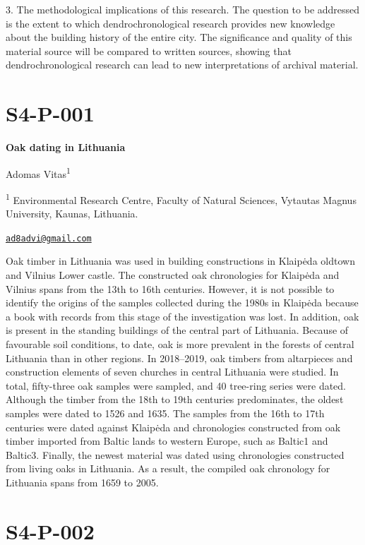 \documentclass[
]{book}
\begin{document}
3. The methodological implications of this research. The question to be addressed is the extent to which dendrochronological research provides new knowledge about the building history of the entire city. The significance and quality of this material source will be compared to written sources, showing that dendrochronological research can lead to new interpretations of archival material.

\hypertarget{s4-p-001}{%
\section*{S4-P-001}\label{s4-p-001}}

\textbf{Oak dating in Lithuania}

Adomas Vitas\textsuperscript{1}

\textsuperscript{1} Environmental Research Centre, Faculty of Natural Sciences, Vytautas Magnus University, Kaunas, Lithuania.

\href{mailto:ad8advi@gmail.com}{\nolinkurl{ad8advi@gmail.com}}

Oak timber in Lithuania was used in building constructions in Klaipėda oldtown and Vilnius Lower castle. The constructed oak chronologies for Klaipėda and Vilnius spans from the 13th to 16th centuries. However, it is not possible to identify the origins of the samples collected during the 1980s in Klaipėda because a book with records from this stage of the investigation was lost. In addition, oak is present in the standing buildings of the central part of Lithuania. Because of favourable soil conditions, to date, oak is more prevalent in the forests of central Lithuania than in other regions. In 2018--2019, oak timbers from altarpieces and construction elements of seven churches in central Lithuania were studied. In total, fifty-three oak samples were sampled, and 40 tree-ring series were dated. Although the timber from the 18th to 19th centuries predominates, the oldest samples were dated to 1526 and 1635. The samples from the 16th to 17th centuries were dated against Klaipėda and chronologies constructed from oak timber imported from Baltic lands to western Europe, such as Baltic1 and Baltic3. Finally, the newest material was dated using chronologies constructed from living oaks in Lithuania. As a result, the compiled oak chronology for Lithuania spans from 1659 to 2005.

\hypertarget{s4-p-002}{%
\section*{S4-P-002}\label{s4-p-002}}
\end{document}
